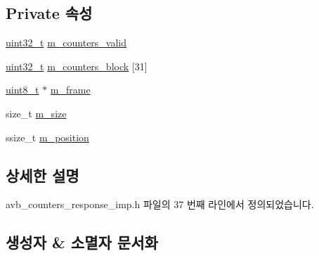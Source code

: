 \subsection*{Private 속성}
\begin{DoxyCompactItemize}
\item 
\hyperlink{parse_8c_a6eb1e68cc391dd753bc8ce896dbb8315}{uint32\+\_\+t} \hyperlink{classavdecc__lib_1_1avb__counters__response__imp_ab528aa8ed91b0a6453238e605c451ce8}{m\+\_\+counters\+\_\+valid}
\item 
\hyperlink{parse_8c_a6eb1e68cc391dd753bc8ce896dbb8315}{uint32\+\_\+t} \hyperlink{classavdecc__lib_1_1avb__counters__response__imp_a4280ad18b84e17884a0eca22237e22a9}{m\+\_\+counters\+\_\+block} \mbox{[}31\mbox{]}
\item 
\hyperlink{stdint_8h_aba7bc1797add20fe3efdf37ced1182c5}{uint8\+\_\+t} $\ast$ \hyperlink{classavdecc__lib_1_1avb__counters__response__imp_a50417969cf438e7c8d698726bbbe2ff9}{m\+\_\+frame}
\item 
size\+\_\+t \hyperlink{classavdecc__lib_1_1avb__counters__response__imp_a0dc3c363255f193681c77b4d2a82e995}{m\+\_\+size}
\item 
ssize\+\_\+t \hyperlink{classavdecc__lib_1_1avb__counters__response__imp_af5e691c4a8a0feb07f48440b321206cd}{m\+\_\+position}
\end{DoxyCompactItemize}


\subsection{상세한 설명}


avb\+\_\+counters\+\_\+response\+\_\+imp.\+h 파일의 37 번째 라인에서 정의되었습니다.



\subsection{생성자 \& 소멸자 문서화}
